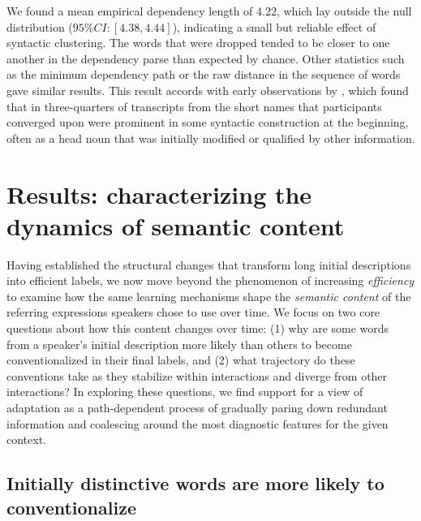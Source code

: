 \documentclass[alpha-refs]{wiley-article}
\begin{document}
We found a mean empirical dependency length of 4.22, which lay outside the null distribution ($95\% CI: [4.38, 4.44]$), indicating a small but reliable effect of syntactic clustering.
The words that were dropped tended to be closer to one another in the dependency parse than expected by chance.
Other statistics such as the minimum dependency path or the raw distance in the sequence of words gave similar results.
This result accords with early observations by \cite{Carroll80_NamingHedges}, which found that in three-quarters of transcripts from \cite{KraussWeinheimer64_ReferencePhrases} the short names that participants converged upon were prominent in some syntactic construction at the beginning, often as a head noun that was initially modified or qualified by other information. 

\section{Results: characterizing the dynamics of semantic content}
\label{sec:content} 

Having established the structural changes that transform long initial descriptions into efficient labels, we now move beyond the phenomenon of increasing \emph{efficiency} to examine how the same learning mechanisms shape the \emph{semantic content} of  the referring expressions speakers chose to use over time.
We focus on two core questions about how this content changes over time: (1) why are some words from a speaker's initial description more likely than others to become conventionalized in their final labels, and (2) what trajectory do these conventions take as they stabilize within interactions and diverge from other interactions?
In exploring these questions, we find support for a view of adaptation as a path-dependent process of gradually paring down redundant information and coalescing around the most diagnostic features for the given context.

\subsection{Initially distinctive words are more likely to conventionalize}
\label{sec:distinctive}
\end{document}
